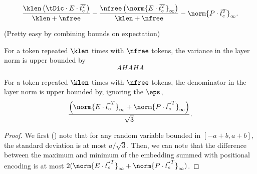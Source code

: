 \begin{lemma}
	\label{lemma:lowerExpBound}
	\[
		\frac{\klen \left(\tDic \cdot E \cdot \vec{t}_c^T\right)}{\klen + \nfree} -
			\frac{\nfree \left(\norm{E \cdot \vec{t}_c^T}_\infty\right)}{\klen + \nfree} - \norm{P \cdot \vec{t}_c^T}_\infty.
	\]
\end{lemma}

\begin{lemma}
	\label{lemma:upperVarBound}
	(Pretty easy by combining bounds on expectation)

	For a token repeated $\klen$ times with $\nfree$ tokens, the variance in the layer norm is upper bounded by
	\[
		AHAHA
	\]
\end{lemma}

\begin{lemma}
    For a token repeated $\klen$ times with $\nfree$ tokens, the denominator in the layer norm is upper bounded by, ignoring the $\eps$,
    \[
	    \frac{\left(\norm{E \cdot \vec{t_c}^T}_\infty + \norm{P \cdot \vec{t_c}^T}_\infty \right)}{\sqrt{3}}.
    \]
\end{lemma}
\begin{proof}
	We first () note that for any random variable bounded in $[-a + b, a + b]$, the standard deviation is at most $a/\sqrt{3}$.
	Then, we can note that the difference between the maximum and minimum of the embedding summed with positional encoding is at most $2(\norm{E \cdot \vec{t_c}^T}_\infty + \norm{P \cdot \vec{t_c}^T}_\infty)$.
\end{proof}

